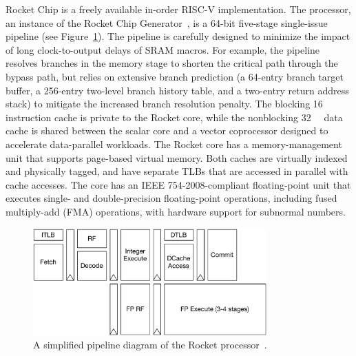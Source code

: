 \documentclass[graybox]{svmult}
\begin{document}
Rocket Chip is a freely available in-order RISC-V implementation.
The processor, an instance of the Rocket Chip Generator~\cite{Rocket2016}, is a 64-bit five-stage single-issue pipeline (see Figure~\ref{fig:6-raven3-rocket}).
The pipeline is carefully designed to minimize the impact of long clock-to-output delays of SRAM macros.
For example, the pipeline resolves branches in the memory stage to shorten the critical path through the bypass path, but relies on extensive branch prediction (a 64-entry branch target buffer, a 256-entry two-level branch history table, and a two-entry return address stack) to mitigate the increased branch resolution penalty.
The blocking \SI{16}{\kibi\byte} instruction cache is private to the Rocket core, while the nonblocking \SI{32}{\kibi\byte} data cache is shared between the scalar core and a vector coprocessor designed to accelerate data-parallel workloads.
The Rocket core has a memory-management unit that supports page-based virtual memory.
Both caches are virtually indexed and physically tagged, and have separate TLBs that are accessed in parallel with cache accesses.
The core has an IEEE 754-2008-compliant floating-point unit that executes single- and double-precision floating-point operations, including fused multiply-add (FMA) operations, with hardware support for subnormal numbers.

\begin{figure}
  \centering
  \includegraphics[width=0.8\textwidth]{6-raven3-rocket}
  \caption{A simplified pipeline diagram of the Rocket processor~\cite{Zimmer2016}.}
  \label{fig:6-raven3-rocket}
\end{figure}

\end{document}
